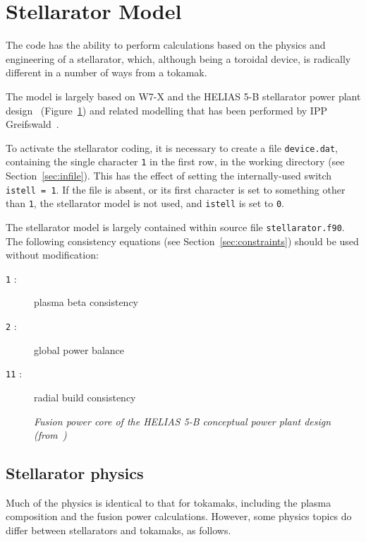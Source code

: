 \documentclass[11pt,a4paper]{report}
\begin{document}
\section{Stellarator Model}

The code has the ability to perform calculations based on the physics and
engineering of a stellarator, which, although being a toroidal device, is
radically different in a number of ways from a tokamak.

The model is largely based on W7-X and the HELIAS 5-B stellarator power plant
design~\cite{helias5b} (Figure~\ref{fig:helias5b}) and related modelling that
has been performed by IPP Greifswald~\cite{stell_geometry, stell_divertor,
  stell_coil}.

To activate the stellarator coding, it is necessary to create a file
\texttt{device.dat}, containing the single character \texttt{1} in the first
row, in the working directory (see Section~\ref{sec:infile}). This has the
effect of setting the internally-used switch \texttt{istell = 1}. If the file
is absent, or its first character is set to something other than \texttt{1},
the stellarator model is not used, and \texttt{istell} is set to
\texttt{0}.

The stellarator model is largely contained within source file
\texttt{stellarator.f90}. The following consistency equations (see
Section~\ref{sec:constraints}) should be used without modification:

\begin{description}
\item [\texttt{1} :] plasma beta consistency
\item [\texttt{2} :] global power balance
\item [\texttt{11} :] radial build consistency
\end{description}

\begin{figure}[tbph]
\centerline{}
\caption[HELIAS 5-B Stellarator Power Plant Design]
{\label{fig:helias5b}
  \textit{Fusion power core of the HELIAS 5-B conceptual power plant design
    (from~\cite{helias5b})}
}
\end{figure}

\subsection{Stellarator physics}

Much of the physics is identical to that for tokamaks, including the plasma
composition and the fusion power calculations. However, some physics topics do
differ between stellarators and tokamaks, as follows.
\end{document}
